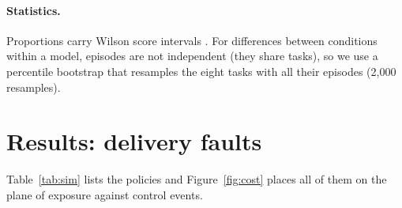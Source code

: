 \documentclass[11pt,a4paper]{article}
\begin{document}
\paragraph{Statistics.}
Proportions carry Wilson score intervals \citep{wilson1927probable}. For differences between conditions within
a model, episodes are not independent (they share tasks), so we use a percentile bootstrap that resamples the
eight tasks with all their episodes (2,000 resamples).

\section{Results: delivery faults}
\label{sec:res-sim}

Table~\ref{tab:sim} lists the policies and Figure~\ref{fig:cost} places all of them on the plane of exposure
against control events.
\end{document}
